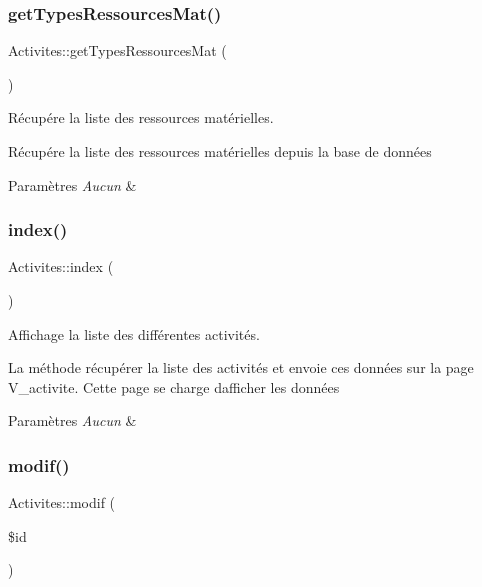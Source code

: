 \subsubsection{\texorpdfstring{get\+Types\+Ressources\+Mat()}{getTypesRessourcesMat()}}
{\footnotesize\ttfamily Activites\+::get\+Types\+Ressources\+Mat (\begin{DoxyParamCaption}{ }\end{DoxyParamCaption})}



Récupére la liste des ressources matérielles. 

Récupére la liste des ressources matérielles depuis la base de données 
\begin{DoxyParams}{Paramètres}
{\em Aucun} & \\
\hline
\end{DoxyParams}
\mbox{\label{class_activites_a3a55c12734928d60f6942a53f974d80a}} 
\subsubsection{\texorpdfstring{index()}{index()}}
{\footnotesize\ttfamily Activites\+::index (\begin{DoxyParamCaption}{ }\end{DoxyParamCaption})}



Affichage la liste des différentes activités. 

La méthode récupérer la liste des activités et envoie ces données sur la page V\+\_\+activite. Cette page se charge d\textquotesingle{}afficher les données 
\begin{DoxyParams}{Paramètres}
{\em Aucun} & \\
\hline
\end{DoxyParams}
\mbox{\label{class_activites_a45a0e20a43963e87840e0c57f62f67d5}} 
\subsubsection{\texorpdfstring{modif()}{modif()}}
{\footnotesize\ttfamily Activites\+::modif (\begin{DoxyParamCaption}\item[{}]{\$id }\end{DoxyParamCaption})}



